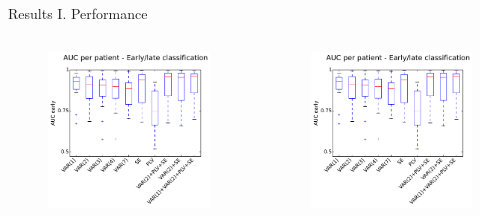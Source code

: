 \documentclass[final,t,overlay, xcolor=table, sans, mathserif]{beamer}
\begin{document}
\begin{frame}{}
\begin{columns}[t]
\begin{column}{.65\linewidth}
\begin{columns}
\begin{block}{Results I. Performance}
\begin{columns}
\begin{figure}
\includegraphics[width=1\textwidth]{figures/kaggle_2_train_test_early.pdf}
\end{figure}
\begin{figure}
\includegraphics[width=1\textwidth]{figures/kaggle_2_train_test_early.pdf}

\end{figure}
\end{columns}
\end{block}
\end{columns}
\end{column}
\end{columns}
\end{frame}
\end{document}
